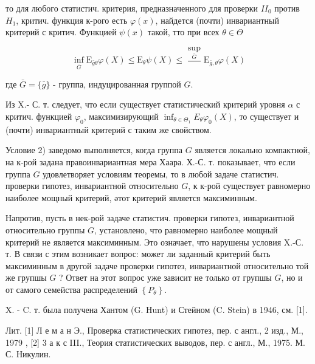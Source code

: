\documentclass[10pt]{article}
\begin{document}
то для любого статистич. критерия, предназначенного для проверки $I I_{0}$ против $H_{1}$, критич. функция к-рого есть $\varphi(x)$, найдется (почти) инвариантный критерий с критич. Функцией $\psi(x)$ такой, тто при всех $\theta \in \Theta$



\[

\inf _{\bar{G}} \mathrm{E}_{\bar{g} \theta} \varphi(X) \leqslant \mathrm{E}_{\theta} \psi(X) \leqslant \frac{\sup _{\bar{G}}}{} \mathrm{E}_{\bar{g}, \theta} \varphi(X)

\]



где $\bar{G}=\{\bar{g}\}$ - группа, индуцированная группой $G$.



Из X.- С. т. следует, что если существует статистический критерий уровня $\alpha$ с критич. функцией $\varphi_{0}$, максимизирующий $\inf _{\theta \in \Theta_{1}} E_{\theta} \varphi_{0}(X)$, то существует и (почти) инвариантный критерий с таким же свойством.



Условие 2) заведомо выполняется, когда группа $G$ является локально компактной, на к-рой задана правоинвариантная мера Хаара. Х.-С. т. показывает, что если группа $G$ удовлетворяет условиям теоремы, то в любой задаче статистич. проверки гипотез, инвариантной относительно $G$, к к-рой существует равномерно наиболее мощный критерий, әтот критерий является максиминным.



Напротив, пусть в нек-рой задаче статистич. проверки гипотез, инвариантной относительно группы $G$, установлено, что равномерно наиболее мощный критерий не является максиминным. Это означает, что нарушены условия X.-С. т. В связи с этим возникает вопрос: может ли заданный критерий быть максиминным в другой задаче проверки гипотез, инвариантной относительно той же групшы $G$ ? Ответ на этот вопрос уже зависит не только от групшы $G$, но и от самого семейства распределений $\left\{P_{\theta}\right\}$.



X. - C. т. была получена Хантом (G. Hunt) и Стейном (C. Stein) в 1946, см. [1].



Лит. [1] Л е м а н Э., Проверка статистических гипотез, пер. с англ., 2 изд., М., 1979 , [2] 3 а к с III., Теория статистических выводов, пер. с англ., М., 1975. М. С. Никулин.
\end{document}
